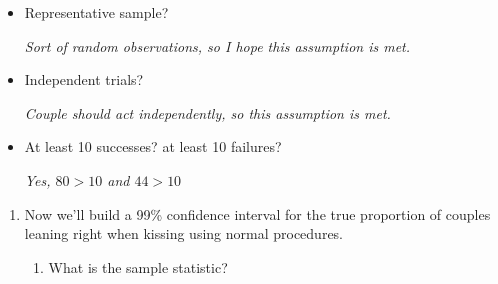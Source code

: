 \begin{enumerate}
     \begin{itemize}

        \item Representative sample?   
\begin{students}
        \vspace{1cm}        
\end{students}

\begin{key}
  {\it  Sort of random observations, so I hope this   assumption is met.}
\end{key}
        \item Independent trials?   
\begin{students}
        \vspace{1cm}        
\end{students}

\begin{key}
  {\it  Couple should act independently, so this assumption is met.}
\end{key}
        \item At least 10 successes? at least 10 failures?   
\begin{students}
        \vspace{1cm}        
\end{students}

\begin{key}
  {\it  Yes, $80>10$ and $44 > 10$}
\end{key}
     \end{itemize}
     \begin{enumerate}
     \item Now we'll build a 99\% confidence interval for the true
       proportion of couples leaning right when kissing using normal
       procedures. 
       \begin{enumerate}
       \item What is the sample statistic?  
\begin{students}
        \vspace{1cm}        
\end{students}


\end{enumerate}
\end{enumerate}
\end{enumerate}

